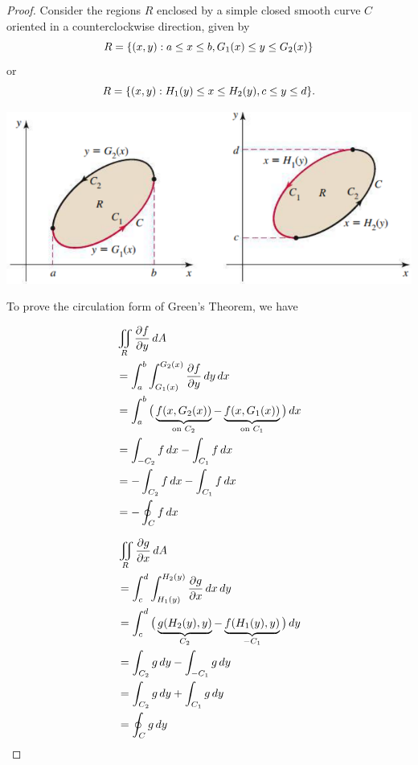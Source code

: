\documentclass[../mathNotesPreamble]{subfiles}
\begin{document}
  \begin{proof}
    Consider the regions $R$ enclosed by a simple closed smooth curve $C$ oriented in a counterclockwise direction, given by
      \[R={\left\{(x,y): a\leq x\leq b, G_1(x)\leq y\leq G_2(x)\right\}}\]
    or
      \[R={\left\{(x,y): H_1(y)\leq x\leq H_2(y), c\leq y\leq d\right\}}.\]
    \begin{center}
      \includegraphics[width=0.65\linewidth]{../images/briggs_17_04/fig17_37}
    \end{center}
    To prove the circulation form of Green's Theorem, we have

    \begin{minipage}{0.5\linewidth}
      \begin{align*}
        &\iint\limits_R \frac{\partial f}{\partial y}\,dA\\
          &= \int_a^b \int_{G_1(x)}^{G_2(x)}\frac{\partial f}{\partial y}\,dy\,dx\\
          &=\int_a^b \big(\underbrace{f{\left(x,G_2(x)\right)}}_{\textnormal{on }C_2}-\underbrace{f{\left(x,G_1(x)\right)}}_{\textnormal{on }C_1}\big)\,dx\\
          &=\int_{-C_2} f\,dx-\int_{C_1} f\,dx\\
          &=-\int_{C_2} f\,dx-\int_{C_1} f\,dx\\
          &=-\oint_C f\,dx
      \end{align*}
    \end{minipage}%
    \begin{minipage}{0.5\linewidth}
      \begin{align*}
        &\iint\limits_R \frac{\partial g}{\partial x}\,dA\\
          &= \int_c^d \int_{H_1(y)}^{H_2(y)}\frac{\partial g}{\partial x}\,dx\,dy\\
          &=\int_c^d \big(\underbrace{g{\left(H_2(y),y\right)}}_{C_2}-\underbrace{f{\left(H_1(y),y\right)}}_{-C_1}\big)\,dy\\
          &=\int_{C_2} g\,dy-\int_{-C_1} g\,dy\\
          &=\int_{C_2} g\,dy+\int_{C_1} g\,dy\\
          &=\oint_C g\,dy
      \end{align*}
    \end{minipage}%
    
  \end{proof}
  \pagebreak 
 
\end{document}
